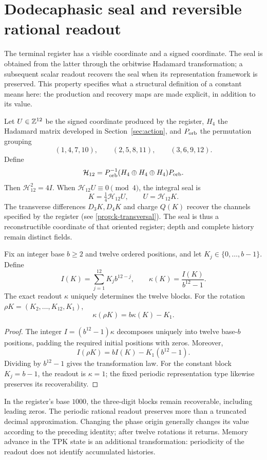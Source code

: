 \section{Dodecaphasic seal and reversible rational readout}
\label{sec:sello}

The terminal register has a visible coordinate and a signed
coordinate. The seal is obtained from the latter through the
orbitwise Hadamard transformation; a subsequent scalar readout recovers
the seal when its representation framework is preserved. This property
specifies what a structural definition of a constant means here:
the production and recovery maps are made explicit, in addition to its value.

Let $U\in\mathbb Z^{12}$ be the signed coordinate produced by the register,
$H_4$ the Hadamard matrix developed in Section~\ref{sec:action},
and $P_{\rm orb}$ the permutation grouping
\[
 (1,4,7,10),\qquad(2,5,8,11),\qquad(3,6,9,12).
\]
Define
\[
 \mathcal H_{12}=P_{\rm orb}^{-1}
 (H_4\oplus H_4\oplus H_4)P_{\rm orb}.
\]
Then $\mathcal H_{12}^2=4I$. When
$\mathcal H_{12}U\equiv0\pmod4$, the integral seal is
\[
 K=\tfrac14\mathcal H_{12}U,
 \qquad U=\mathcal H_{12}K.
\]
The transverse differences $D_3K,D_4K$ and charge $Q(K)$ recover
the channels specified by the register (see \ref{prop:k-transversal}).
The seal is thus a reconstructible coordinate of that oriented register;
depth and complete history remain distinct fields.

\begin{proposition}
Fix an integer base $b\ge2$ and twelve ordered positions, and let
$K_j\in\{0,\ldots,b-1\}$. Define
\[
 I(K)=\sum_{j=1}^{12}K_jb^{12-j},\qquad
 \kappa(K)=\frac{I(K)}{b^{12}-1}.
\]
The exact readout $\kappa$ uniquely determines the twelve blocks.
For the rotation $\rho K=(K_2,\ldots,K_{12},K_1)$,
\[
 \boxed{\kappa(\rho K)=b\kappa(K)-K_1.}
\]
\end{proposition}
\begin{proof}
The integer $I=(b^{12}-1)\kappa$ decomposes uniquely into twelve
base-$b$ positions, padding the required initial positions
with zeros. Moreover,
\[
 I(\rho K)=bI(K)-K_1(b^{12}-1).
\]
Dividing by $b^{12}-1$ gives the transformation law. For the
constant block $K_j=b-1$, the readout is $\kappa=1$; the fixed
periodic representation type likewise preserves its recoverability.
\end{proof}

In the register's base $1000$, the three-digit blocks remain
recoverable, including leading zeros. The periodic rational
readout preserves more than a truncated decimal approximation.
Changing the phase origin generally changes its value according to
the preceding identity; after twelve rotations it returns.
Memory advance in the TPK state is an additional transformation:
periodicity of the readout does not identify accumulated histories.

